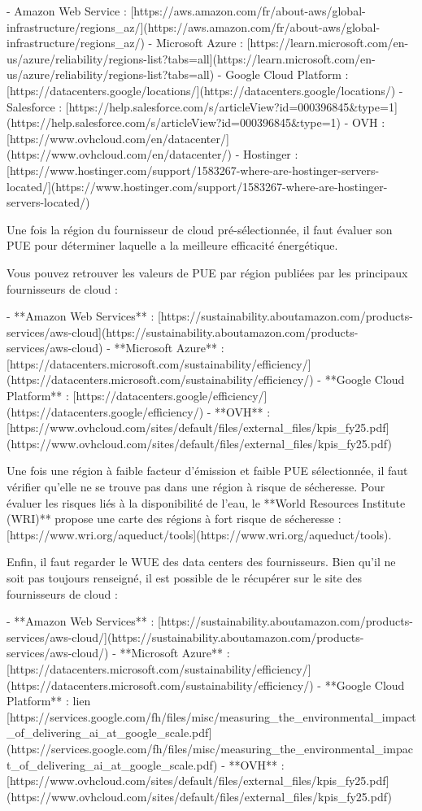 {- Amazon Web Service : [https://aws.amazon.com/fr/about-aws/global-infrastructure/regions_az/](https://aws.amazon.com/fr/about-aws/global-infrastructure/regions_az/)
- Microsoft Azure : [https://learn.microsoft.com/en-us/azure/reliability/regions-list?tabs=all](https://learn.microsoft.com/en-us/azure/reliability/regions-list?tabs=all)
- Google Cloud Platform : [https://datacenters.google/locations/](https://datacenters.google/locations/)
- Salesforce : [https://help.salesforce.com/s/articleView?id=000396845&type=1](https://help.salesforce.com/s/articleView?id=000396845&type=1)
- OVH : [https://www.ovhcloud.com/en/datacenter/](https://www.ovhcloud.com/en/datacenter/)
- Hostinger : [https://www.hostinger.com/support/1583267-where-are-hostinger-servers-located/](https://www.hostinger.com/support/1583267-where-are-hostinger-servers-located/)

Une fois la région du fournisseur de cloud pré-sélectionnée, il faut évaluer son PUE pour déterminer laquelle a la meilleure efficacité énergétique.

Vous pouvez retrouver les valeurs de PUE par région publiées par les principaux fournisseurs de cloud :

- **Amazon Web Services** : [https://sustainability.aboutamazon.com/products-services/aws-cloud](https://sustainability.aboutamazon.com/products-services/aws-cloud)
- **Microsoft Azure** : [https://datacenters.microsoft.com/sustainability/efficiency/](https://datacenters.microsoft.com/sustainability/efficiency/)
- **Google Cloud Platform** : [https://datacenters.google/efficiency/](https://datacenters.google/efficiency/)
- **OVH** : [https://www.ovhcloud.com/sites/default/files/external_files/kpis_fy25.pdf](https://www.ovhcloud.com/sites/default/files/external_files/kpis_fy25.pdf)

Une fois une région à faible facteur d'émission et faible PUE sélectionnée, il faut vérifier qu'elle ne se trouve pas dans une région à risque de sécheresse.
Pour évaluer les risques liés à la disponibilité de l'eau, le **World Resources Institute (WRI)** propose une carte des régions à fort risque de sécheresse :
[https://www.wri.org/aqueduct/tools](https://www.wri.org/aqueduct/tools).

Enfin, il faut regarder le WUE des data centers des fournisseurs. Bien qu'il ne soit pas toujours renseigné, il est possible de le récupérer sur le site des fournisseurs de cloud :

- **Amazon Web Services** : [https://sustainability.aboutamazon.com/products-services/aws-cloud/](https://sustainability.aboutamazon.com/products-services/aws-cloud/)
- **Microsoft Azure** : [https://datacenters.microsoft.com/sustainability/efficiency/](https://datacenters.microsoft.com/sustainability/efficiency/)
- **Google Cloud Platform** : lien [https://services.google.com/fh/files/misc/measuring_the_environmental_impact_of_delivering_ai_at_google_scale.pdf](https://services.google.com/fh/files/misc/measuring_the_environmental_impact_of_delivering_ai_at_google_scale.pdf)
- **OVH** : [https://www.ovhcloud.com/sites/default/files/external_files/kpis_fy25.pdf](https://www.ovhcloud.com/sites/default/files/external_files/kpis_fy25.pdf)

}
